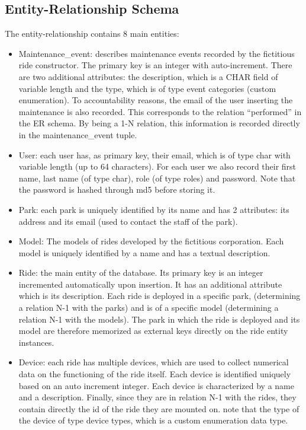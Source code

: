\subsection{Entity-Relationship Schema}


\noindent The entity-relationship contains 8 main entities:
\begin{itemize}
    \item Maintenance\_event: describes maintenance events recorded by the fictitious ride constructor. The primary key is an integer with auto-increment. There are two additional attributes: the description, which is a CHAR field of variable length and the type, which is of type event categories (custom enumeration). To accountability reasons, the email of the user inserting the maintenance is also recorded. This corresponds to the relation “performed” in the ER schema. By being a 1-N relation, this information is recorded directly in the maintenance\_event tuple.
    \item User: each user has, as primary key, their email, which is of type char with variable length (up to 64 characters). For each user we also record their first name, last name (of type char), role (of type roles) and password. Note that the password is hashed through md5 before storing it.
    \item Park: each park is uniquely identified by its name and has 2 attributes: its address and its email (used to contact the staff of the park).
    \item Model: The models of rides developed by the fictitious corporation. Each model is uniquely identified by a name and has a textual description.
    \item Ride: the main entity of the database. Its primary key is an integer incremented automatically upon insertion. It has an additional attribute which is its description. Each ride is deployed in a specific park, (determining a relation N-1 with the parks) and is of a specific model (determining a relation N-1 with the models). The park in which the ride is deployed and its model are therefore memorized as external keys directly on the ride entity instances.
    \item Device: each ride has multiple devices, which are used to collect numerical data on the functioning of the ride itself. Each device is identified uniquely based on an auto increment integer. Each device is characterized by a name and a description. Finally, since they are in relation N-1 with the rides, they contain directly the id of the ride they are mounted on. note that the type of the device of type device types, which is a custom enumeration data type.

\end{itemize}
